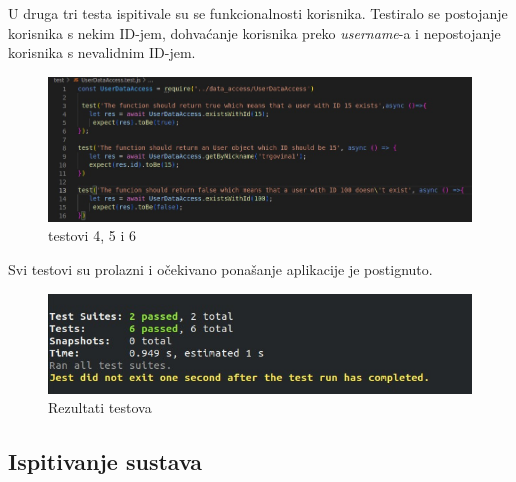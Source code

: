			U druga tri testa ispitivale su se funkcionalnosti korisnika. Testiralo se postojanje korisnika s nekim ID-jem, dohvaćanje korisnika preko \textit{username}-a i nepostojanje korisnika s nevalidnim ID-jem.
			
			\begin{figure}[H]
			\includegraphics[width=\textwidth]{slike/test456.jpeg} %
			\caption{testovi 4, 5 i 6}
			\label{fig:test456} %
			\end{figure}
			
			Svi testovi su prolazni i očekivano ponašanje aplikacije je postignuto.
			
			\begin{figure}[H]
			\includegraphics[width=\textwidth]{slike/reztest16.jpeg} %
			\caption{Rezultati testova}
			\label{fig:reztest16} %
			\end{figure}
			
			
			
			
			
			
			\subsection{Ispitivanje sustava}
			
			 
